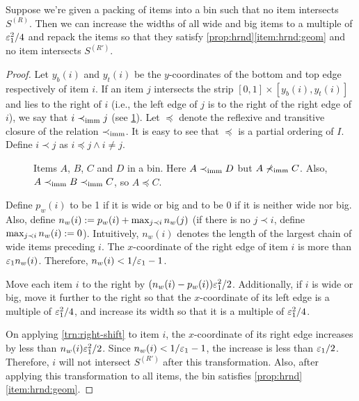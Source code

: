 \begin{lemma}
\label{lem:right-shift}
Suppose we're given a packing of items into a bin such that no item intersects $S^{(R)}$.
Then we can increase the widths of all wide and big items to a multiple of $\varepsilon_1^2/4$
and repack the items so that they satisfy \cref{prop:hrnd}\ref{item:hrnd:geom}
and no item intersects $S^{(R')}$.
\end{lemma}
\begin{proof}
Let $y_b(i)$ and $y_t(i)$ be the $y$-coordinates of the bottom and top edge
respectively of item $i$. If an item $j$ intersects the strip
$[0, 1] \times [y_b(i), y_t(i)]$ and lies to the right of $i$
(i.e., the left edge of $j$ is to the right of the right edge of $i$),
we say that $i \prec_{\mathrm{imm}} j$ (see \cref{fig:prec-imm}).
Let $\preceq$ denote the reflexive and transitive closure of the relation $\prec_{\mathrm{imm}}$.
It is easy to see that $\preceq$ is a partial ordering of $I$.
Define $i \prec j$ as $i \preceq j \wedge i \neq j$.

\begin{figure}[htb]
\centering

\caption[$A \precImm D, A \not\precImm C, A \preceq C$.]%
{Items $A$, $B$, $C$ and $D$ in a bin.
Here $A \prec_{\mathrm{imm}} D$ but $A \not\prec_{\mathrm{imm}} C$.
Also, $A \prec_{\mathrm{imm}} B \prec_{\mathrm{imm}} C$, so $A \preceq C$.}
\label{fig:prec-imm}
\end{figure}

Define $p_w(i)$ to be 1 if it is wide or big and to be 0 if it is neither wide
nor big. Also, define $n_w(i) := p_w(i) + \max_{j \prec i} n_w(j)$
(if there is no $j \prec i$, define $\max_{j \prec i} n_w(i) := 0$).
Intuitively, $n_w(i)$ denotes the length of the largest chain of wide items preceding $i$.
The $x$-coordinate of the right edge of item $i$ is more than $\varepsilon_1 n_w(i)$.
Therefore, $n_w(i) < 1/\varepsilon_1 - 1$.

\begin{transformation}
\label{trn:right-shift}
Move each item $i$ to the right by $(n_w(i) - p_w(i))\varepsilon_1^2/2$.
Additionally, if $i$ is wide or big, move it further to the right so that the $x$-coordinate
of its left edge is a multiple of $\varepsilon_1^2/4$, and increase its width so that it
is a multiple of $\varepsilon_1^2/4$.
\end{transformation}

On applying \cref{trn:right-shift} to item $i$, the $x$-coordinate of its right
edge increases by less than $n_w(i)\varepsilon_1^2/2$.
Since $n_w(i) < 1/\varepsilon_1 - 1$, the increase is less than $\varepsilon_1/2$.
Therefore, $i$ will not intersect $S^{(R')}$ after this transformation.
Also, after applying this transformation to all items, the bin satisfies
\cref{prop:hrnd}\ref{item:hrnd:geom}.


\end{proof}
